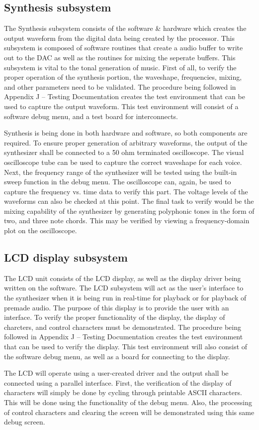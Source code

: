 \documentclass[abstract=on,paper=a4, fontsize=12pt]{scrartcl}		%
\begin{document}
  \subsection{Synthesis subsystem}
    The Synthesis subsystem consists of the software \& hardware which creates the output waveform from the digital data being created by the processor. This subsystem is composed of software routines that create a audio buffer to write out to the DAC as well as the routines for mixing the seperate buffers. This subsystem is vital to the tonal generation of music. First of all, to verify the proper operation of the synthesis portion, the waveshape, frequencies, mixing, and other parameters need to be validated. The procedure being followed in Appendix J – Testing Documentation creates the test environment that can be used to capture the output waveform. This test environment will consist of a software debug menu, and a test board for interconnects.\par
      Synthesis is being done in both hardware and software, so both components are required. To ensure proper generation of arbitrary waveforms, the output of the synthesizer shall be connected to a 50 ohm terminated oscilloscope. The visual oscilloscope tube can be used to capture the correct waveshape for each voice. Next, the frequency range of the synthesizer will be tested using the built-in sweep function in the debug menu. The oscilloscope can, again, be used to capture the frequency vs. time data to verify this part. The voltage levels of the waveforms can also be checked at this point. The final task to verify would be the mixing capability of the synthesizer by generating polyphonic tones in the form of two, and three note chords. This may be verified by viewing a frequency-domain plot on the oscilloscope.\par
  \subsection{LCD display subsystem}
    The LCD unit consists of the LCD display, as well as the display driver being written on the software. The LCD subsystem will act as the user's interface to the synthesizer when it is being run in real-time for playback or for playback of premade audio. The purpose of this display is to provide the user with an interface. To verify the proper functionality of the display, the display of charcters, and control characters must be demonstrated. The procedure being followed in Appendix J – Testing Documentation creates the test environment that can be used to verify the display. This test environment will also consist of the software debug menu, as well as a board for connecting to the display.\par
      The LCD will operate using a user-created driver and the output shall be connected using a parallel interface. First, the verification of the display of characters will simply be done by cycling through printable ASCII characters. This will be done using the functionality of the debug menu. Also, the processing of control characters and clearing the screen will be demonstrated using this same debug screen.\par
\end{document}
